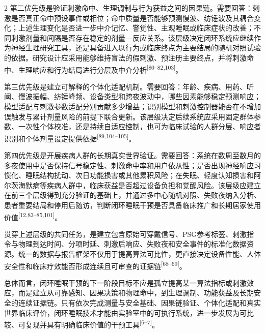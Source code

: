 \documentclass[UTF8,zihao=5,fontset=none]{ctexart}
\newcommand{\hei}{\CJKfamily{hei}}
\newcommand{\leveltwo}[1]{%
  \par\noindent{\hei\fontsize{10.5pt}{15.6pt}\selectfont\bfseries #1\par}}
\newcommand{\refcite}[1]{\nolinebreak[4]\textsuperscript{[#1]}}
\begin{document}
\begin{multicols}{2}
第二优先级是验证刺激命中、生理调制与行为获益之间的因果链。需要回答：刺激是否真正命中预设事件或相位；命中质量是否能够预测慢波、纺锤波及其耦合变化；上述生理变化是否进一步中介记忆、警觉性、主观睡眠或临床症状的改善；不同刺激剂量和间隔是否存在稳定的剂量—反应关系。该层级决定闭环系统应继续作为神经生理研究工具，还是具备进入以行为或临床终点为主要结局的随机对照试验的依据。研究设计应采用能够维持盲法的假刺激、预注册主要终点，并将刺激命中、生理响应和行为结局进行分层及中介分析\refcite{80--82,103}。\par

第三优先级是建立可解释的个体化适配机制。需要回答：年龄、疾病、用药、听阈、慢波振幅、纺锤峰频、设备类型和跨夜波动中，哪些因素能够稳定预测响应；模型适配与刺激参数适配分别贡献多少增益；识别模型和刺激控制器能否在不增加误触发与累计剂量风险的前提下联合更新。该层级决定后续系统应采用固定群体参数、一次性个体校准，还是持续自适应控制，也可为临床试验的人群分层、响应者识别和个体剂量设定提供依据\refcite{89,104--105}。\par

第四优先级是开展疾病人群的长期真实世界验证。需要回答：系统在数周至数月的多夜使用中是否保持信号稳定性、刺激命中率和用户依从性；是否出现神经响应习惯化、睡眠结构扰动、次日功能损害或其他累积风险；在失眠、轻度认知损害和阿尔茨海默病等疾病人群中，临床获益是否超过设备负担和觉醒风险。该层级应建立在前三个层级得到充分验证的基础上，并通过多中心随机对照、失败夜纳入分析、患者重要结局和停用后随访，判断闭环睡眠干预是否具备临床推广和长期居家使用价值\refcite{12,83--85,101}。\par

贯穿上述层级的共同任务，是建立包含原始可穿戴信号、PSG参考标签、刺激指令与物理到达时间、分项时延、刺激后响应、失败夜和安全事件的标准化数据资源。统一的数据与报告框架不仅用于提高算法可比性，更直接决定设备性能、人体安全性和临床疗效能否形成连续且可审查的证据链\refcite{68--69}。\par

\leveltwo{7.3 总结}

总体而言，闭环睡眠干预的下一阶段目标不应是孤立提高某一算法指标或刺激效应，而是建立从可靠感知、因果决策和物理命中，到生理调制、功能获益及长期安全的连续证据链。只有依次完成测量与安全基础、因果链验证、个体化适配和真实世界临床评价，闭环睡眠技术才能由实验室中的可执行系统，进一步发展为可比较、可复现并具有明确临床价值的干预工具\refcite{6--7}。\par



\end{multicols}
\end{document}
